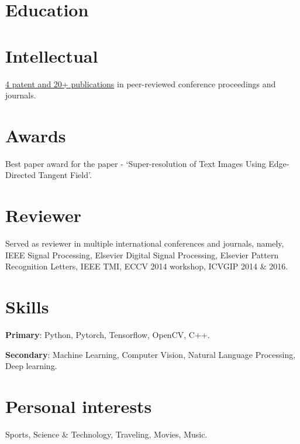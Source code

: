 \documentclass[a4paper,online]{adcv}
\begin{document}
\begin{adcvtabletwo}
  

\end{adcvtabletwo}

\section{Education}

\begin{adcvtabletwo}
\end{adcvtabletwo}

\section{Intellectual}

\href{https://scholar.google.co.in/citations?user=SaF-0PcAAAAJ&hl=en}{4 patent and 20+ publications} in peer-reviewed conference proceedings and journals.

\section{Awards}

Best paper award for the paper - `Super-resolution of Text Images Using Edge-Directed Tangent Field'.

\section{Reviewer}

Served as reviewer in multiple international conferences and journals, namely, IEEE Signal Processing, Elsevier Digital Signal Processing, Elsevier Pattern Recognition Letters, IEEE TMI, ECCV 2014 workshop, ICVGIP 2014 \& 2016.

\section{Skills}

\textbf{Primary}: Python, Pytorch, Tensorflow, OpenCV, C++.

\textbf{Secondary}: Machine Learning, Computer Vision, Natural Language Processing, Deep learning.


\section{Personal interests}

Sports, Science \& Technology, Traveling, Movies, Music.
\end{document}
